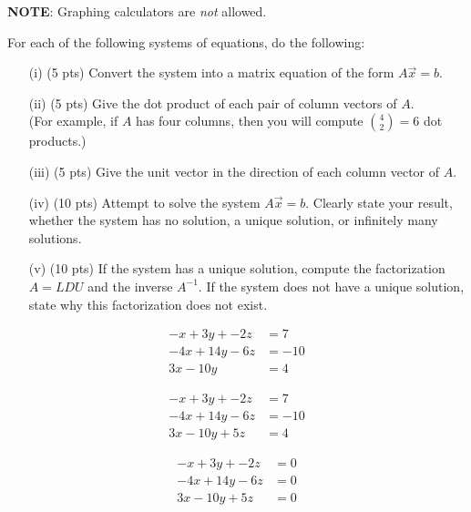 \documentclass[10pt]{article}
\newcommand{\examprobs}{
\textbf{NOTE}: Graphing calculators are \emph{not} allowed. 

\vspace{10mm}

For each of the following systems of equations, do the following: 
\begin{itemize}
\item[(i) ] (5 pts) Convert the system into a matrix equation of the form $A \vec{x} = b$. 
\item[(ii) ] (5 pts) Give the dot product of each pair of column vectors of $A$. \\
(For example, if $A$ has four columns, then you will compute ${4 \choose 2} = 6$ dot products.)
\item[(iii) ] (5 pts) Give the unit vector in the direction of each column vector of $A$. 
\item[(iv) ] (10 pts) Attempt to solve the system $A \vec{x} = b$. Clearly state your result, whether the system has no solution, a unique solution, or infinitely many solutions.
\item[(v) ] (10 pts) If the system has a unique solution, compute the factorization $A = LDU$ and the inverse $A^{-1}$. If the system does not have a unique solution, state why this factorization does not exist.
\end{itemize}
}
\newcommand{\answershere}[1]{\vspace{130mm}
\begin{center}
\line(1,0){400}
\end{center}
\textbf{Write answers for Problem #1 clearly here:}}
\begin{document}




\namefield



\examprobs

\pagebreak



\begin{align*}  %
-x + 3y + -2z & = 7 \\
-4x + 14y - 6z & = -10 \\
3x - 10y  & = 4
\end{align*}


\pagebreak




\begin{align*}  %
-x + 3y + -2z & = 7 \\
-4x + 14y - 6z & = -10 \\
3x - 10y + 5z & = 4
\end{align*}


\pagebreak




\begin{align*}  %
-x + 3y + -2z & = 0 \\
-4x + 14y - 6z & = 0 \\
3x - 10y + 5z & = 0
\end{align*}

\end{document}

